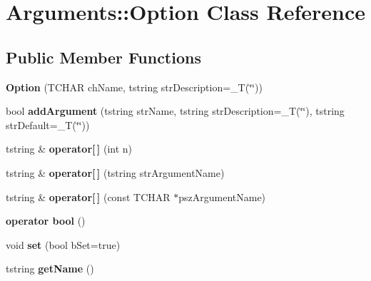 \hypertarget{classArguments_1_1Option}{}\section{Arguments\+:\+:Option Class Reference}
\label{classArguments_1_1Option}
\subsection*{Public Member Functions}
\begin{DoxyCompactItemize}
\item 
\mbox{\label{classArguments_1_1Option_ab0c3c863ae5073d26fc6a429cb9e9e8f}} 
{\bfseries Option} (T\+C\+H\+AR ch\+Name, tstring str\+Description=\+\_\+T(\char`\"{}\char`\"{}))
\item 
\mbox{\label{classArguments_1_1Option_a725edb431ee73e82b11c0a66a37c68d7}} 
bool {\bfseries add\+Argument} (tstring str\+Name, tstring str\+Description=\+\_\+T(\char`\"{}\char`\"{}), tstring str\+Default=\+\_\+T(\char`\"{}\char`\"{}))
\item 
\mbox{\label{classArguments_1_1Option_aa743dc570bc8e8a5cd7029b010ca9d5c}} 
tstring \& {\bfseries operator\mbox{[}$\,$\mbox{]}} (int n)
\item 
\mbox{\label{classArguments_1_1Option_a87d9d032b56ca62a0e97f92b9fff7708}} 
tstring \& {\bfseries operator\mbox{[}$\,$\mbox{]}} (tstring str\+Argument\+Name)
\item 
\mbox{\label{classArguments_1_1Option_a2250ed8eb4fffb29d5b33ea2badce73e}} 
tstring \& {\bfseries operator\mbox{[}$\,$\mbox{]}} (const T\+C\+H\+AR $\ast$psz\+Argument\+Name)
\item 
\mbox{\label{classArguments_1_1Option_a65b2a42c83abd464c0cf5966871e4ee1}} 
{\bfseries operator bool} ()
\item 
\mbox{\label{classArguments_1_1Option_af706653ec399fb385f7d161c0c2b1dd5}} 
void {\bfseries set} (bool b\+Set=true)
\item 
\mbox{\label{classArguments_1_1Option_af594ef3af4f7740a18a7b5f38515e08a}} 
tstring {\bfseries get\+Name} ()
\end{DoxyCompactItemize}
